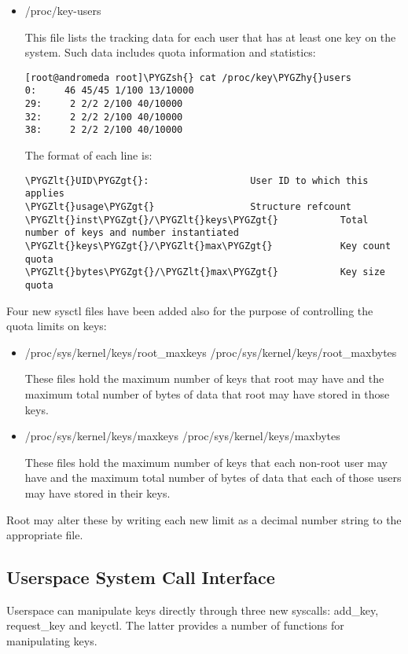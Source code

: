 \documentclass[a4paper,8pt,english]{sphinxmanual}
\def\PYGZlt{\char`\<}
\def\PYGZgt{\char`\>}
\def\PYGZsh{\char`\#}
\def\PYGZhy{\char`\-}
\begin{document}
\begin{itemize}
\item {} 
/proc/key-users

This file lists the tracking data for each user that has at least one key
on the system.  Such data includes quota information and statistics:

\begin{Verbatim}[commandchars=\\\{\}]
[root@andromeda root]\PYGZsh{} cat /proc/key\PYGZhy{}users
0:     46 45/45 1/100 13/10000
29:     2 2/2 2/100 40/10000
32:     2 2/2 2/100 40/10000
38:     2 2/2 2/100 40/10000
\end{Verbatim}

The format of each line is:

\begin{Verbatim}[commandchars=\\\{\}]
\PYGZlt{}UID\PYGZgt{}:                  User ID to which this applies
\PYGZlt{}usage\PYGZgt{}                 Structure refcount
\PYGZlt{}inst\PYGZgt{}/\PYGZlt{}keys\PYGZgt{}           Total number of keys and number instantiated
\PYGZlt{}keys\PYGZgt{}/\PYGZlt{}max\PYGZgt{}            Key count quota
\PYGZlt{}bytes\PYGZgt{}/\PYGZlt{}max\PYGZgt{}           Key size quota
\end{Verbatim}

\end{itemize}

Four new sysctl files have been added also for the purpose of controlling the
quota limits on keys:
\begin{itemize}
\item {} 
/proc/sys/kernel/keys/root\_maxkeys
/proc/sys/kernel/keys/root\_maxbytes

These files hold the maximum number of keys that root may have and the
maximum total number of bytes of data that root may have stored in those
keys.

\item {} 
/proc/sys/kernel/keys/maxkeys
/proc/sys/kernel/keys/maxbytes

These files hold the maximum number of keys that each non-root user may
have and the maximum total number of bytes of data that each of those
users may have stored in their keys.

\end{itemize}

Root may alter these by writing each new limit as a decimal number string to
the appropriate file.


\subsection{Userspace System Call Interface}
\label{security/keys/core:userspace-system-call-interface}
Userspace can manipulate keys directly through three new syscalls: add\_key,
request\_key and keyctl. The latter provides a number of functions for
manipulating keys.
\end{document}
